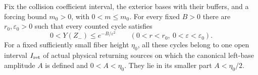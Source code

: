 \begin{lemma}
\label{lem:pc-collision-localization}
Fix the collision coefficient interval, the exterior bases with their
buffers, and a forcing bound $m_0>0$, with $0<m\le m_0$. For every fixed
$B>0$ there are $r_0,\varepsilon_0>0$ such that every counted cycle
satisfies
\begin{equation}
\label{eq:pc-collision-localization}
 0<Y(Z_-)\le e^{-B/\varepsilon^2}
 \qquad(0<r<r_0,\ 0<\varepsilon<\varepsilon_0).
\end{equation}
For a fixed sufficiently small fiber height $\eta_0$, all these cycles
belong to one open interval $I_{\rm ret}$ of actual physical returning
sources on which the canonical left-base amplitude $A$ is defined and
$0<A<\eta_0$. They lie in its smaller part $A<\eta_0/2$.
\end{lemma}
